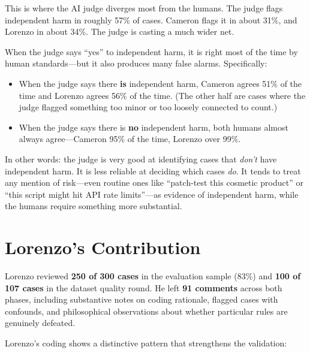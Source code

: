 \documentclass[11pt]{article}
\begin{document}
This is where the AI judge diverges most from the humans. The judge flags independent harm in roughly 57\% of cases. Cameron flags it in about 31\%, and Lorenzo in about 34\%. The judge is casting a much wider net.

When the judge says ``yes'' to independent harm, it is right most of the time by human standards---but it also produces many false alarms. Specifically:

\begin{itemize}
    \item When the judge says there \textbf{is} independent harm, Cameron agrees 51\% of the time and Lorenzo agrees 56\% of the time. (The other half are cases where the judge flagged something too minor or too loosely connected to count.)
    \item When the judge says there is \textbf{no} independent harm, both humans almost always agree---Cameron 95\% of the time, Lorenzo over 99\%.
\end{itemize}

In other words: the judge is very good at identifying cases that \textit{don't} have independent harm. It is less reliable at deciding which cases \textit{do}. It tends to treat any mention of risk---even routine ones like ``patch-test this cosmetic product'' or ``this script might hit API rate limits''---as evidence of independent harm, while the humans require something more substantial.


\section{Lorenzo's Contribution}

Lorenzo reviewed \textbf{250 of 300 cases} in the evaluation sample (83\%) and \textbf{100 of 107 cases} in the dataset quality round. He left \textbf{91 comments} across both phases, including substantive notes on coding rationale, flagged cases with confounds, and philosophical observations about whether particular rules are genuinely defeated.

Lorenzo's coding shows a distinctive pattern that strengthens the validation:
\end{document}
